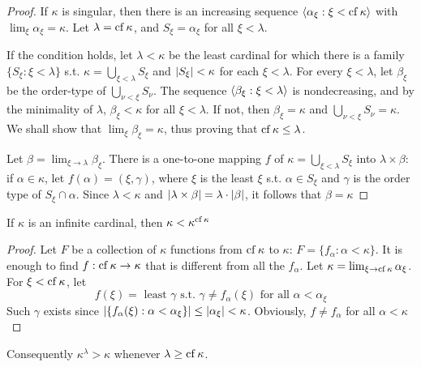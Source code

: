\documentclass[11pt]{article}
\begin{document}
\begin{proof}
If \(\kappa\) is singular, then there is an increasing sequence \(\langle\alpha_\xi:\xi<\operatorname{cf}\kappa\rangle\) with \(\lim_\xi\alpha_\xi=\kappa\).
Let \(\lambda=\operatorname{cf}\kappa\), and \(S_\xi=\alpha_\xi\) for all \(\xi<\lambda\).

If the condition holds, let \(\lambda<\kappa\) be the least cardinal for which there is a
family \(\{S_\xi:\xi<\lambda\}\) s.t. \(\kappa=\bigcup_{\xi<\lambda}S_\xi\) and \(\abs{S_\xi}<\kappa\) for each \(\xi<\lambda\). For
every \(\xi<\lambda\), let \(\beta_\xi\) be the order-type of \(\bigcup_{\nu<\xi}S_\nu\). The sequence \(\langle\beta_\xi:\xi<\lambda\rangle\) is
nondecreasing, and by the minimality of \(\lambda\), \(\beta_\xi<\kappa\) for all \(\xi<\lambda\). If not, then \(\beta_\xi=\kappa\)
and \(\bigcup_{\nu<\xi}S_\nu=\kappa\). We shall show
that \(\lim_\xi\beta_\xi=\kappa\), thus proving that \(\operatorname{cf}\kappa\le\lambda\).

Let \(\beta=\lim_{\xi\to\lambda}\beta_\xi\). There is a one-to-one mapping \(f\) of \(\kappa=\bigcup_{\xi<\lambda}S_\xi\) into \(\lambda\times\beta\):
if \(\alpha\in\kappa\), let \(f(\alpha)=(\xi,\gamma)\), where \(\xi\) is the least \(\xi\) s.t. \(\alpha\in S_\xi\) and \(\gamma\) is the order type
of \(S_\xi\cap\alpha\). Since \(\lambda<\kappa\) and \(\abs{\lambda\times\beta}=\lambda\cdot\abs{\beta}\), it follows that \(\beta=\kappa\)
\end{proof}

\begin{theorem}[]
If \(\kappa\) is an infinite cardinal, then \(\kappa<\kappa^{\operatorname{cf}\kappa}\)
\end{theorem}

\begin{proof}
Let \(F\) be a collection of \(\kappa\) functions from \(\operatorname{cf}\kappa\) to \(\kappa\): \(F=\{f_\alpha:\alpha<\kappa\}\). It is enough
to find \(f:\operatorname{cf}\kappa\to\kappa\) that is different from all the \(f_\alpha\). Let \(\kappa=\lim_{\xi\to\operatorname{cf}\kappa}\alpha_\xi\).
For \(\xi<\operatorname{cf}\kappa\), let
\begin{equation*}
f(\xi)=\text{ least $\gamma$ s.t. }\gamma\neq f_\alpha(\xi)\text{ for all }\alpha<\alpha_\xi
\end{equation*}
Such \(\gamma\) exists since \(\abs{\{f_\alpha(\xi):\alpha<\alpha_\xi\}}\le\abs{\alpha_\xi}<\kappa\). Obviously, \(f\neq f_\alpha\) for all \(\alpha<\kappa\)
\end{proof}

Consequently \(\kappa^\lambda>\kappa\) whenever \(\lambda\ge\operatorname{cf}\kappa\).
\end{document}
